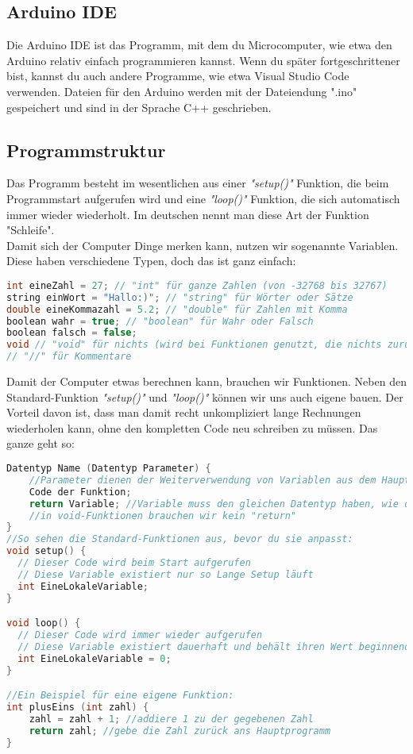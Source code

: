 \subsection{\large{Arduino IDE}}
Die Arduino IDE ist das Programm, mit dem du Microcomputer, wie etwa den Arduino relativ einfach programmieren kannst. Wenn du später fortgeschrittener bist, kannst du auch andere Programme, wie etwa Visual Studio Code verwenden. Dateien für den Arduino werden mit der Dateiendung ".ino" gespeichert und sind in der Sprache C++ geschrieben.\\
\subsection{\large{Programmstruktur}}
Das Programm besteht im wesentlichen aus einer \textit{"setup()"} Funktion, die beim Programmstart aufgerufen wird und eine \textit{"loop()"} Funktion, die sich automatisch immer wieder wiederholt. Im deutschen nennt man diese Art der Funktion "Schleife".\\
Damit sich der Computer Dinge merken kann, nutzen wir sogenannte Variablen.
Diese haben verschiedene Typen, doch das ist ganz einfach:
\begin{lstlisting}[language=c, caption=Datentypen in C]
int eineZahl = 27; // "int" für ganze Zahlen (von -32768 bis 32767)
string einWort = "Hallo:)"; // "string" für Wörter oder Sätze
double eineKommazahl = 5.2; // "double" für Zahlen mit Komma
boolean wahr = true; // "boolean" für Wahr oder Falsch
boolean falsch = false;
void // "void" für nichts (wird bei Funktionen genutzt, die nichts zurückgeben sollen)
// "//" für Kommentare

\end{lstlisting}
\hfill \break \hfill \break \hfill \break
Damit der Computer etwas berechnen kann, brauchen wir Funktionen. Neben den Standard-Funktion  \textit{"setup()"} und \textit{"loop()"} können wir uns auch eigene bauen. Der Vorteil davon ist, dass man damit recht unkompliziert lange Rechnungen wiederholen kann, ohne den kompletten Code neu schreiben zu müssen.
Das ganze geht so:

\begin{lstlisting}[language=c, caption=Funktionen in C]
Datentyp Name (Datentyp Parameter) {
	//Parameter dienen der Weiterverwendung von Variablen aus dem Hauptprogramm
	Code der Funktion; 
	return Variable; //Variable muss den gleichen Datentyp haben, wie der zuvor vor dem Funktionsnamen definierte Datentyp
	//in void-Funktionen brauchen wir kein "return"
}
//So sehen die Standard-Funktionen aus, bevor du sie anpasst:
void setup() {
  // Dieser Code wird beim Start aufgerufen
  // Diese Variable existiert nur so Lange Setup läuft
  int EineLokaleVariable;  
}

void loop() {
  // Dieser Code wird immer wieder aufgerufen
  // Diese Variable existiert dauerhaft und behält ihren Wert beginnend mit 0
  int EineLokaleVariable = 0; 
}

//Ein Beispiel für eine eigene Funktion:
int plusEins (int zahl) {
	zahl = zahl + 1; //addiere 1 zu der gegebenen Zahl
	return zahl; //gebe die Zahl zurück ans Hauptprogramm
}
\end{lstlisting}
